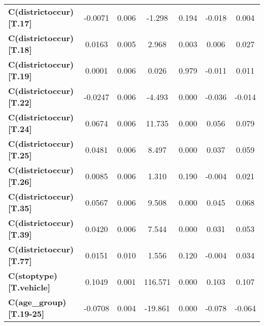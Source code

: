 \begin{center}
\begin{tabular}{lcccccc}
\textbf{C(districtoccur)[T.17]}                                                   &      -0.0071  &        0.006     &    -1.298  &         0.194        &       -0.018    &        0.004     \\
\textbf{C(districtoccur)[T.18]}                                                   &       0.0163  &        0.005     &     2.968  &         0.003        &        0.006    &        0.027     \\
\textbf{C(districtoccur)[T.19]}                                                   &       0.0001  &        0.006     &     0.026  &         0.979        &       -0.011    &        0.011     \\
\textbf{C(districtoccur)[T.22]}                                                   &      -0.0247  &        0.006     &    -4.493  &         0.000        &       -0.036    &       -0.014     \\
\textbf{C(districtoccur)[T.24]}                                                   &       0.0674  &        0.006     &    11.735  &         0.000        &        0.056    &        0.079     \\
\textbf{C(districtoccur)[T.25]}                                                   &       0.0481  &        0.006     &     8.497  &         0.000        &        0.037    &        0.059     \\
\textbf{C(districtoccur)[T.26]}                                                   &       0.0085  &        0.006     &     1.310  &         0.190        &       -0.004    &        0.021     \\
\textbf{C(districtoccur)[T.35]}                                                   &       0.0567  &        0.006     &     9.508  &         0.000        &        0.045    &        0.068     \\
\textbf{C(districtoccur)[T.39]}                                                   &       0.0420  &        0.006     &     7.544  &         0.000        &        0.031    &        0.053     \\
\textbf{C(districtoccur)[T.77]}                                                   &       0.0151  &        0.010     &     1.556  &         0.120        &       -0.004    &        0.034     \\
\textbf{C(stoptype)[T.vehicle]}                                                   &       0.1049  &        0.001     &   116.571  &         0.000        &        0.103    &        0.107     \\
\textbf{C(age\_group)[T.19-25]}                                                   &      -0.0708  &        0.004     &   -19.861  &         0.000        &       -0.078    &       -0.064     \\

\end{tabular}
\end{center}
